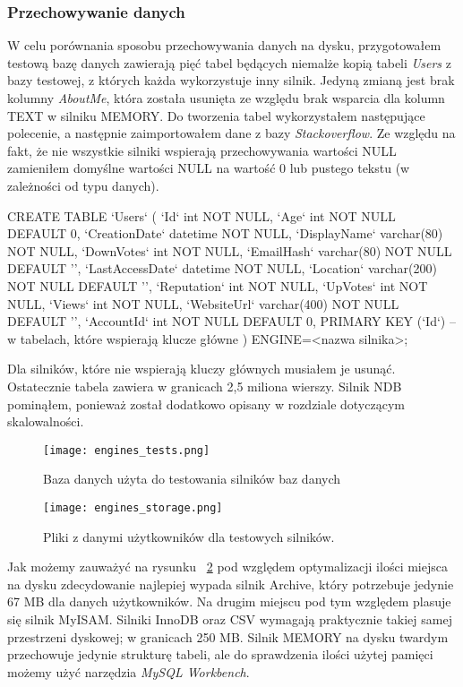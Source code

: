 \subsubsection{Przechowywanie danych}
W celu porównania sposobu przechowywania danych na dysku, przygotowałem testową bazę danych zawierają pięć tabel będących niemalże kopią tabeli \textit{Users} z bazy testowej, z których każda wykorzystuje inny silnik. Jedyną zmianą jest brak kolumny \textit{AboutMe}, która została usunięta ze względu brak wsparcia dla kolumn TEXT w silniku MEMORY. Do tworzenia tabel wykorzystałem następujące polecenie, a następnie zaimportowałem dane z bazy \textit{Stackoverflow}. Ze względu na fakt, że nie wszystkie silniki wspierają przechowywania wartości NULL zamieniłem domyślne wartości NULL na wartość 0 lub pustego tekstu (w zależności od typu danych).
\begin{spverbatim}
	CREATE TABLE `Users` (
	`Id` int NOT NULL,
	`Age` int NOT NULL DEFAULT 0,
	`CreationDate` datetime NOT NULL,
	`DisplayName` varchar(80) NOT NULL,
	`DownVotes` int NOT NULL,
	`EmailHash` varchar(80) NOT NULL DEFAULT '',
	`LastAccessDate` datetime NOT NULL,
	`Location` varchar(200) NOT NULL DEFAULT '',
	`Reputation` int NOT NULL,
	`UpVotes` int NOT NULL,
	`Views` int NOT NULL,
	`WebsiteUrl` varchar(400) NOT NULL DEFAULT '',
	`AccountId` int NOT NULL DEFAULT 0,
	PRIMARY KEY (`Id`) -- w tabelach, które wspierają klucze główne
	) ENGINE=<nazwa silnika>;
\end{spverbatim}
Dla silników, które nie wspierają kluczy głównych musiałem je usunąć. Ostatecznie tabela zawiera w granicach 2,5 miliona wierszy. Silnik NDB pominąłem, ponieważ został dodatkowo opisany w rozdziale dotyczącym skalowalności.
\begin{figure}[!h]
	\caption{Baza danych użyta do testowania silników baz danych}
	\centering
	\texttt{[image: engines\_tests.png]}
	\label{fig:label}
\end{figure}
\begin{figure}[!h]
	\caption{Pliki z danymi użytkowników dla testowych silników.}
	\centering
	\texttt{[image: engines\_storage.png]}
	\label{fig:engines_storage}
\end{figure}
Jak możemy zauważyć na rysunku ~\ref{fig:engines_storage} pod względem optymalizacji ilości miejsca na dysku zdecydowanie najlepiej wypada silnik Archive, który potrzebuje jedynie 67 MB dla danych użytkowników. Na drugim miejscu pod tym względem plasuje się silnik MyISAM. Silniki InnoDB oraz CSV wymagają praktycznie takiej samej przestrzeni dyskowej; w granicach 250 MB. Silnik MEMORY na dysku twardym przechowuje jedynie strukturę tabeli, ale do sprawdzenia ilości użytej pamięci możemy użyć narzędzia \textit{MySQL Workbench}.
